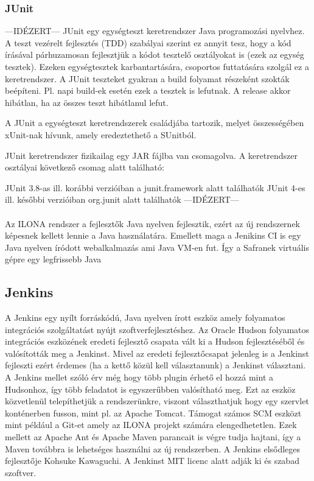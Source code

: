 \subsubsection{JUnit}
---IDÉZERT---
JUnit egy egységteszt keretrendszer Java programozási nyelvhez. A teszt vezérelt fejlesztés (TDD) szabályai szerint ez annyit tesz, hogy a kód írásával párhuzamosan fejlesztjük a kódot tesztelő osztályokat is (ezek az egység tesztek). Ezeken egységtesztek karbantartására, csoportos futtatására szolgál ez a keretrendszer. A JUnit teszteket gyakran a build folyamat részeként szokták beépíteni. Pl. napi build-ek esetén ezek a tesztek is lefutnak. A release akkor hibátlan, ha az összes teszt hibátlanul lefut.

A JUnit a egységteszt keretrendszerek családjába tartozik, melyet összességében xUnit-nak hívunk, amely eredeztethető a SUnitból.

JUnit keretrendszer fizikailag egy JAR fájlba van csomagolva. A keretrendszer osztályai következő csomag alatt található:

JUnit 3.8-as ill. korábbi verzióiban a junit.framework alatt találhatók
JUnit 4-es ill. későbbi verzióiban org.junit alatt találhatók
---IDÉZERT---

\paragraph{}
Az ILONA rendszer a fejlesztők Java nyelven fejlesztik, ezért az új rendszernek képesnek kellett lennie a Java használatára. 
Emellett maga a Jenikins CI is egy Java nyelven íródott webalkalmazás ami Java VM-en fut. 
Így a Safranek virtuális gépre egy legfrissebb Java 

\subsection{Jenkins}
A Jenkins egy nyílt forráskódú, Java nyelven írott eszköz amely folyamatos integrációs szolgáltatást nyújt szoftverfejlesztéshez. 
Az Oracle Hudson folyamatos integrációs eszközének eredeti fejlesztő csapata vált ki a Hudson fejlesztéséből és valósították meg a Jenkinst. 
Mivel az eredeti fejlesztőcsapat jelenleg is a Jenkinst fejleszti ezért érdemes (ha a kettő közül kell választanunk) a Jenkinst választani. 
A Jenkins mellet szóló érv még hogy több plugin érhető el hozzá mint a Hudsonhoz, így több feladatot is egyszerűbben valósítható meg. 
Ezt az eszköz közvetlenül telepíthetjük a rendszerünkre, viszont választhatjuk hogy egy szervlet konténerben fusson, mint pl. az Apache Tomcat. 
Támogat számos SCM eszközt mint például a Git-et amely az ILONA projekt számára elengedhetetlen. 
Ezek mellett az Apache Ant és Apache Maven parancait is végre tudja hajtani, így a Maven továbbra is lehetséges használni az új rendszerben. 
A Jenkins elsődleges fejlesztője Kohsuke Kawaguchi. A Jenkinst MIT licenc alatt adják ki és szabad szoftver. 

